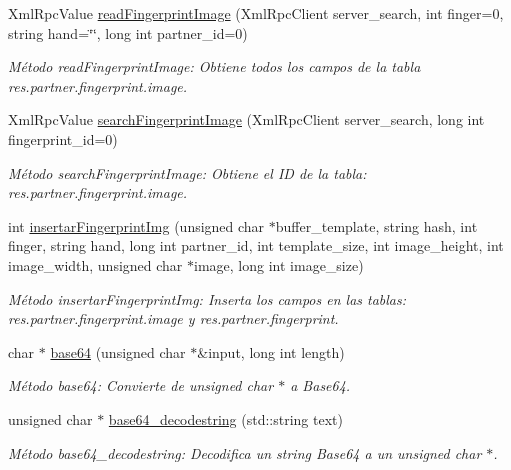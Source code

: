 \begin{DoxyCompactItemize}
Xml\+Rpc\+Value \hyperlink{classFingerprint_a1060a55c0807ddea7c8ce3235f3bab49}{read\+Fingerprint\+Image} (Xml\+Rpc\+Client server\+\_\+search, int finger=0, string hand=\char`\"{}\char`\"{}, long int partner\+\_\+id=0)
\begin{DoxyCompactList}\small\item\em Método read\+Fingerprint\+Image\+: Obtiene todos los campos de la tabla res.\+partner.\+fingerprint.\+image. \end{DoxyCompactList}\item 
Xml\+Rpc\+Value \hyperlink{classFingerprint_adbf6af7ab3485df438e8525b4089e28a}{search\+Fingerprint\+Image} (Xml\+Rpc\+Client server\+\_\+search, long int fingerprint\+\_\+id=0)
\begin{DoxyCompactList}\small\item\em Método search\+Fingerprint\+Image\+: Obtiene el ID de la tabla\+: res.\+partner.\+fingerprint.\+image. \end{DoxyCompactList}\item 
int \hyperlink{classFingerprint_ad21765e70cee5626ca35007dc115e1e3}{insertar\+Fingerprint\+Img} (unsigned char $\ast$buffer\+\_\+template, string hash, int finger, string hand, long int partner\+\_\+id, int template\+\_\+size, int image\+\_\+height, int image\+\_\+width, unsigned char $\ast$image, long int image\+\_\+size)
\begin{DoxyCompactList}\small\item\em Método insertar\+Fingerprint\+Img\+: Inserta los campos en las tablas\+: res.\+partner.\+fingerprint.\+image y res.\+partner.\+fingerprint. \end{DoxyCompactList}\item 
char $\ast$ \hyperlink{classFingerprint_a2d4e78e328f46d57aff25a40f69a6064}{base64} (unsigned char $\ast$\&input, long int length)
\begin{DoxyCompactList}\small\item\em Método base64\+: Convierte de unsigned char $\ast$ a Base64. \end{DoxyCompactList}\item 
unsigned char $\ast$ \hyperlink{classFingerprint_a4f4c8a3a0e248d18f69c6057562b8031}{base64\+\_\+decodestring} (std\+::string text)
\begin{DoxyCompactList}\small\item\em Método base64\+\_\+decodestring\+: Decodifica un string Base64 a un unsigned char $\ast$. \end{DoxyCompactList}\item 

\end{DoxyCompactItemize}
